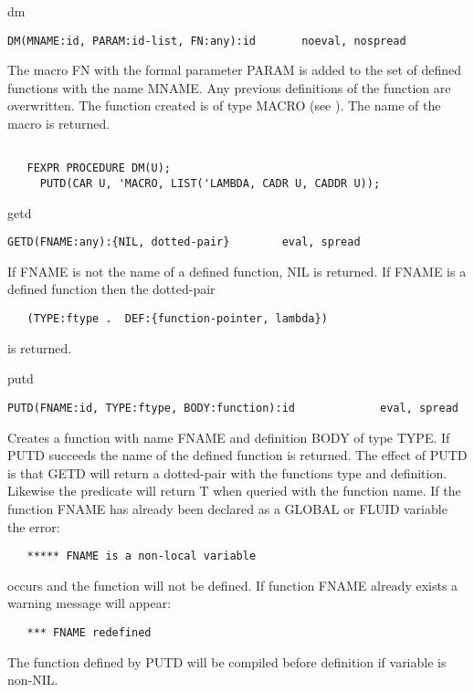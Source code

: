 \begin{Function}{dm}
\begin{verbatim}
DM(MNAME:id, PARAM:id-list, FN:any):id       noeval, nospread
\end{verbatim}
   The  macro FN with the formal  parameter PARAM is added to the
   set  of defined  functions with  the name  MNAME. Any previous
   definitions  of the  function are  overwritten.   The function
   created is of type MACRO (see ).
   The name of the macro is returned.
\begin{verbatim}

   FEXPR PROCEDURE DM(U);
     PUTD(CAR U, 'MACRO, LIST('LAMBDA, CADR U, CADDR U));
\end{verbatim}


\end{Function}
\begin{Function}{getd}
\begin{verbatim}
GETD(FNAME:any):{NIL, dotted-pair}        eval, spread
\end{verbatim}
   If   FNAME  is  not  the  name  of  a  defined  function,  NIL
   is  returned.     If  FNAME is  a  defined  function  then the
   dotted-pair
\begin{verbatim}
   (TYPE:ftype .  DEF:{function-pointer, lambda})
\end{verbatim}
   is returned.

\end{Function}
\begin{Function}{putd}
\begin{verbatim}
PUTD(FNAME:id, TYPE:ftype, BODY:function):id             eval, spread
\end{verbatim}
   Creates  a  function with  name FNAME  and definition  BODY of
   type  TYPE. If PUTD succeeds the  name of the defined function
   is  returned.  The  effect of PUTD is that  GETD will return a
   dotted-pair  with the functions type and definition.  Likewise
   the   predicate will  return T  when queried  with the
   function name.
   If  the function FNAME  has already been  declared as a GLOBAL
   or FLUID variable the error:
\begin{verbatim}
   ***** FNAME is a non-local variable
\end{verbatim}
   occurs  and the  function will  not be  defined.   If function
   FNAME already exists a warning message will appear:
\begin{verbatim}
   *** FNAME redefined
\end{verbatim}
   The   function  defined  by  PUTD   will  be  compiled  before
   definition if  variable is non-NIL.


\end{Function}
